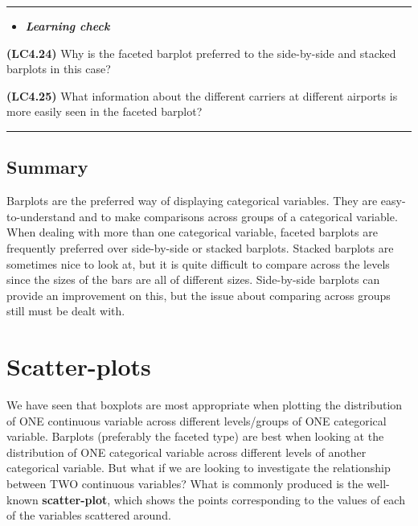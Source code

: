 \documentclass[]{tufte-book}
\newenvironment{rmdblock}[1]
  {\begin{shaded*}
  \begin{itemize}
  \renewcommand{\labelitemi}{
    \raisebox{-.7\height}[0pt][0pt]{
    }
  }
  \item
  }
  {
  \end{itemize}
  \end{shaded*}
  }
\newenvironment{learncheck}
  {\begin{rmdblock}{warning}}
  {\end{rmdblock}}
\begin{document}
\begin{center}\rule{\linewidth}{\linethickness}\end{center}

\begin{learncheck}
\textbf{\emph{Learning check}}
\end{learncheck}

\textbf{(LC4.24)} Why is the faceted barplot preferred to the
side-by-side and stacked barplots in this case?

\textbf{(LC4.25)} What information about the different carriers at
different airports is more easily seen in the faceted barplot?

\begin{center}\rule{\linewidth}{\linethickness}\end{center}

\subsection{Summary}\label{summary-2}

Barplots are the preferred way of displaying categorical variables. They
are easy-to-understand and to make comparisons across groups of a
categorical variable. When dealing with more than one categorical
variable, faceted barplots are frequently preferred over side-by-side or
stacked barplots. Stacked barplots are sometimes nice to look at, but it
is quite difficult to compare across the levels since the sizes of the
bars are all of different sizes. Side-by-side barplots can provide an
improvement on this, but the issue about comparing across groups still
must be dealt with.

\section{Scatter-plots}\label{scatter-plots}

We have seen that boxplots are most appropriate when plotting the
distribution of ONE continuous variable across different levels/groups
of ONE categorical variable. Barplots (preferably the faceted type) are
best when looking at the distribution of ONE categorical variable across
different levels of another categorical variable. But what if we are
looking to investigate the relationship between TWO continuous
variables? What is commonly produced is the well-known
\textbf{scatter-plot}, which shows the points corresponding to the
values of each of the variables scattered around.
\end{document}
